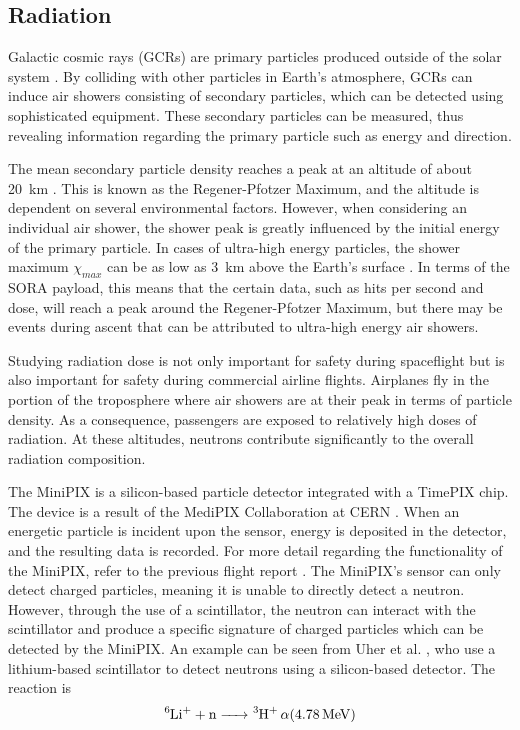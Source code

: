\subsection{Radiation}
\label{sec: Radiation Background}

Galactic cosmic rays (GCRs) are primary particles produced outside of the solar system \cite{GCRs}.
By colliding with other particles in Earth's atmosphere, GCRs can induce air showers consisting of secondary particles, which can be detected using sophisticated equipment.
These secondary particles can be measured, thus revealing information regarding the primary particle such as energy and direction. 

The mean secondary particle density reaches a peak at an altitude of about \SI{20}{\kilo\meter} \cite{regener}.
This is known as the Regener-Pfotzer Maximum, and the altitude is dependent on several environmental factors.
However, when considering an individual air shower, the shower peak is greatly influenced by the initial energy of the primary particle.
In cases of ultra-high energy particles, the shower maximum $\chi _{max}$ can be as low as \SI{3}{\kilo\meter} above the Earth's surface \cite{Frank}.
In terms of the SORA payload, this means that the certain data, such as hits per second and dose, will reach a peak around the Regener-Pfotzer Maximum, but there may be events during ascent that can be attributed to ultra-high energy air showers.

Studying radiation dose is not only important for safety during spaceflight but is also important for safety during commercial airline flights.
Airplanes fly in the portion of the troposphere where air showers are at their peak in terms of particle density. As a consequence, passengers are exposed to relatively high doses of radiation.
At these altitudes, neutrons contribute significantly to the overall radiation composition.

The MiniPIX \cite{silicon_sensor} is a silicon-based particle detector integrated with a TimePIX \cite{timepix} chip. The device is a result of the MediPIX Collaboration at CERN \cite{medipix}. 
When an energetic particle is incident upon the sensor, energy is deposited in the detector, and the resulting data is recorded.
For more detail regarding the functionality of the MiniPIX, refer to the previous flight report \cite{SORA}.
The MiniPIX's sensor can only detect charged particles, meaning it is unable to directly detect a neutron. However, through the use of a scintillator, the neutron can interact with the scintillator and produce a specific signature of charged particles which can be detected by the MiniPIX.
An example can be seen from Uher et al. \cite{Uher}, who use a lithium-based scintillator to detect neutrons using a silicon-based detector. The reaction is \[\ce{^6Li^+ + n -> ^3H+ \alpha (\SI{4.78}{\mega\eV})}\]

